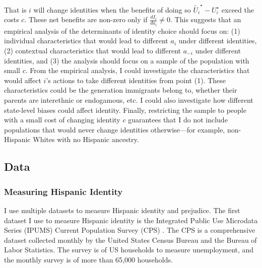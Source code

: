 \documentclass[12pt, fullpage]{article}
\begin{document}
That is $i$ will change identities when the benefits of doing so $\tilde{U_{i}}^{\star} - U_{i}^{\star}$ exceed the costs $c$. These net benefits are non-zero only if $\frac{d I_i}{d a_i} \neq 0$. This suggests that an empirical analysis of the determinants of identity choice should focus on: (1) individual characteristics that would lead to different $a_i$ under different identities, (2) contextual characteristics that would lead to different $a_{-i}$ under different identities, and (3) the analysis should focus on a sample of the population with small $c$. From the empirical analysis, I could investigate the characteristics that would affect $i$'s actions to take different identities from point (1). These characteristics could be the generation immigrants belong to, whether their parents are interethnic or endogamous, etc. I could also investigate how different state-level biases could affect identity. Finally, restricting the sample to people with a small cost of changing identity $c$ guarantees that I do not include populations that would never change identities otherwise---for example, non-Hispanic Whites with no Hispanic ancestry.

\subsection{Data}\label{sec:data}

\subsubsection{Measuring Hispanic Identity}\label{subsec:cps}

I use multiple datasets to measure Hispanic identity and prejudice. The first dataset I use to measure Hispanic identity is the Integrated Public Use Microdata Series (IPUMS) Current Population Survey (CPS) \citep{floodsarahIntegratedPublicUse2021a}. The CPS is a comprehensive dataset collected monthly by the United States Census Bureau and the Bureau of Labor Statistics. \linebreak The survey is of US households to measure unemployment, and the monthly survey is of more than 65,000 households.
\end{document}
